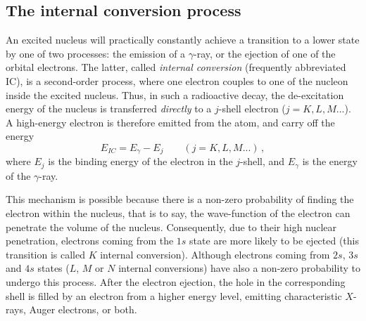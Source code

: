 \subsection{The internal conversion process}

An excited nucleus will practically constantly achieve a transition to a lower state by one of two processes: the emission of a $\gamma$-ray, or the ejection of one of the orbital electrons.
The latter, called \emph{internal conversion} (frequently abbreviated IC), is a second-order process, where one electron couples to one of the nucleon inside the excited nucleus.
Thus, in such a radioactive decay, the de-excitation energy of the nucleus is transferred \emph{directly} to a $j$-shell electron ($j=K,L,M...$).
A high-energy electron is therefore emitted from the atom, and carry off the energy
\begin{equation}
E_{IC} = E_{\gamma}-E_{j}\qquad (j=K,L,M...)\,,
\end{equation}
where $E_{j}$ is the binding energy of the electron in the $j$-shell, and $E_{\gamma}$ is the energy of the $\gamma$-ray.

This mechanism is possible because there is a non-zero probability of finding the electron within the nucleus, that is to say, the wave-function of the electron can penetrate the volume of the nucleus.
Consequently, due to their high nuclear penetration, electrons coming from the $1s$ state are more likely to be ejected (this transition is called $K$ internal conversion).
Although electrons coming from $2s$, $3s$ and $4s$ states ($L$, $M$ or $N$ internal conversions) have also a non-zero probability to undergo this process.
After the electron ejection, the hole in the corresponding shell is filled by an electron from a higher energy level, emitting characteristic $X$-rays, Auger electrons, or both.

